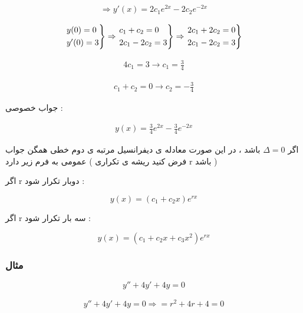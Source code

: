 \documentclass[12pt]{book}
\begin{document}
\begin{align*}
\Rightarrow y'(x) = 2c_{1}e^{2x} - 2c_{2}e^{-2x}
\end{align*}


\begin{align*}
\begin{rcases}
y(0) = 0 \\
y'(0) = 3
\end{rcases}
\Rightarrow
\begin{rcases}
c_{1} + c_{2} = 0 \\
2c_{1} - 2c_{2} = 3
\end{rcases}
\Rightarrow
\begin{rcases}
2c_{1} + 2c_{2} = 0 \\
2c_{1} - 2c_{2} = 3
\end{rcases}
\end{align*}



\begin{align*}
4c_{1} = 3 \to c_{1} = \frac{3}{4}
\end{align*}

\begin{align*}
c_{1} + c_{2} = 0 \to c_{2} = - \frac{3}{4}
\end{align*}


جواب خصوصی : 

\begin{align*}
y(x) = \frac{3}{4} e^{2x} - \frac{3}{4} e^{-2x}
\end{align*}




\begin{tcolorbox}
اگر
$\Delta = 0$
باشد ، در این صورت معادله ی دیفرانسیل مرتبه ی دوم خطی همگن جواب عمومی به فرم زیر دارد ( فرض کنید ریشه ی تکراری r باشد )

اگر r دوبار تکرار شود :

$$y(x) = ( c_{1} + c_{2}x ) e^{rx}$$


اگر r سه بار تکرار شود :


$$y(x) = ( c_{1} + c_{2}x + c_{3}x^{2} ) e^{rx}$$


\end{tcolorbox}


\subsubsection{مثال}


$$
y'' + 4y' + 4y = 0
$$


\begin{align*}
y'' + 4y' + 4y = 0 \Rightarrow = r^{2} + 4r + 4 = 0
\end{align*}
\end{document}

